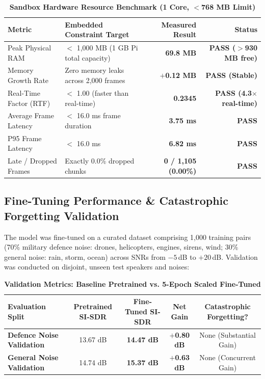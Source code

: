 \documentclass[11pt,a4paper]{article}
\begin{document}
\begin{table}[h]
\centering
\small
\caption{\textbf{Sandbox Hardware Resource Benchmark (1 Core, $<$768 MB Limit)}}
\vspace{4pt}
\begin{tabularx}{\textwidth}{l X r r}
\toprule
\textbf{Metric} & \textbf{Embedded Constraint Target} & \textbf{Measured Result} & \textbf{Status} \\
\midrule
Peak Physical RAM & $<$ 1,000 MB (1 GB Pi total capacity) & \textbf{69.8 MB} & \textbf{PASS ($>$930 MB free)} \\
Memory Growth Rate & Zero memory leaks across 2,000 frames & \textbf{$+$0.12 MB} & \textbf{PASS (Stable)} \\
Real-Time Factor (RTF) & $<$ 1.00 (faster than real-time) & \textbf{0.2345} & \textbf{PASS (4.3$\times$ real-time)} \\
Average Frame Latency & $<$ 16.0 ms frame duration & \textbf{3.75 ms} & \textbf{PASS} \\
P95 Frame Latency & $<$ 16.0 ms & \textbf{6.82 ms} & \textbf{PASS} \\
Late / Dropped Frames & Exactly 0.0\% dropped chunks & \textbf{0 / 1,105 (0.00\%)} & \textbf{PASS} \\
\bottomrule
\end{tabularx}
\end{table}

\subsection{Fine-Tuning Performance \& Catastrophic Forgetting Validation}
The model was fine-tuned on a curated dataset comprising 1,000 training pairs (70\% military defence noise: drones, helicopters, engines, sirens, wind; 30\% general noise: rain, storm, ocean) across SNRs from $-5$\,dB to $+20$\,dB. Validation was conducted on disjoint, unseen test speakers and noises:

\begin{table}[h]
\centering
\small
\caption{\textbf{Validation Metrics: Baseline Pretrained vs. 5-Epoch Scaled Fine-Tuned}}
\vspace{4pt}
\begin{tabularx}{\textwidth}{X c c c c}
\toprule
\textbf{Evaluation Split} & \textbf{Pretrained SI-SDR} & \textbf{Fine-Tuned SI-SDR} & \textbf{Net Gain} & \textbf{Catastrophic Forgetting?} \\
\midrule
\textbf{Defence Noise Validation} & 13.67 dB & \textbf{14.47 dB} & \textbf{$+$0.80 dB} & None (Substantial Gain) \\
\textbf{General Noise Validation} & 14.74 dB & \textbf{15.37 dB} & \textbf{$+$0.63 dB} & None (Concurrent Gain) \\
\bottomrule
\end{tabularx}
\end{table}
\end{document}
